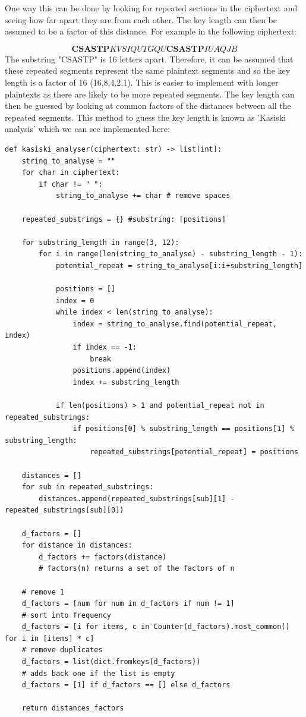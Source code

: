 \documentclass{article}
\begin{document}
One way this can be done by looking for repeated sections in the ciphertext and seeing how far apart they are from each other. The key length can then be assumed to be a factor of this distance. For example in the following ciphertext:\medskip

\[\bm{CSASTP}KVSIQUTGQU\bm{CSASTP}IUAQJB\]
\medskip
The substring "CSASTP" is 16 letters apart. Therefore, it can be assumed that these repeated segments represent the same plaintext segments and so the key length is a factor of 16 (16,8,4,2,1). This is easier to implement with longer plaintexts as there are likely to be more repeated segments. The key length can then be guessed by looking at common factors of the distances between all the repeated segments. This method to guess the key length is known as 'Kasiski analysis' \cite{kasiski} which we can see implemented here:\medskip

\begin{lstlisting}
def kasiski_analyser(ciphertext: str) -> list[int]:
    string_to_analyse = ""
    for char in ciphertext:
        if char != " ":
            string_to_analyse += char # remove spaces

    repeated_substrings = {} #substring: [positions]

    for substring_length in range(3, 12):
        for i in range(len(string_to_analyse) - substring_length - 1):
            potential_repeat = string_to_analyse[i:i+substring_length]

            positions = []
            index = 0
            while index < len(string_to_analyse):
                index = string_to_analyse.find(potential_repeat, index)
                if index == -1:
                    break
                positions.append(index)
                index += substring_length

            if len(positions) > 1 and potential_repeat not in repeated_substrings:
                if positions[0] % substring_length == positions[1] % substring_length:
                    repeated_substrings[potential_repeat] = positions

    distances = []
    for sub in repeated_substrings:
        distances.append(repeated_substrings[sub][1] - repeated_substrings[sub][0])

    d_factors = []
    for distance in distances:
        d_factors += factors(distance)
        # factors(n) returns a set of the factors of n

    # remove 1
    d_factors = [num for num in d_factors if num != 1]
    # sort into frequency
    d_factors = [i for items, c in Counter(d_factors).most_common() for i in [items] * c]
    # remove duplicates
    d_factors = list(dict.fromkeys(d_factors))
    # adds back one if the list is empty
    d_factors = [1] if d_factors == [] else d_factors

    return distances_factors
\end{lstlisting}
\medskip
\end{document}
